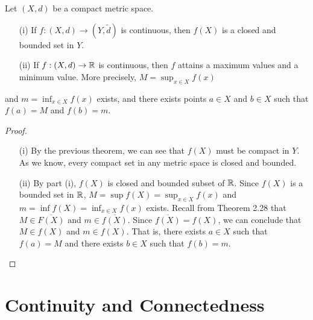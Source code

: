 \documentclass[a4paper]{article}
\begin{document}
\begin{theorem}
    Let \( (X,d) \) be a compact metric space. 
    \begin{enumerate}
        \item[(i)] If \( f: (X,d) \to (Y,\tilde{d}) \) is continuous, then \( f(X) \) is a closed and bounded set in \( Y  \). 
        \item[(ii)] If \( f: (X,d) \to \mathbb{R}   \) is continuous, then \( f  \) attains a maximum values and a minimum value. More precisely, \( M = \sup_{x \in X } f(x)  \)
    \end{enumerate} and \( m = \inf_{x \in X } f(x) \) exists, and there exists points \( a \in X  \) and \( b \in X  \) such that \( f(a) = M  \) and \( f(b) = m \).
\end{theorem}
\begin{proof}
\begin{enumerate}
    \item[(i)] By the previous theorem, we can see that \( f(X) \) must be compact in \( Y  \). As we know, every compact set in any metric space is closed and bounded. 
    \item[(ii)] By part (i), \( f(X)  \) is closed and bounded subset of \( \mathbb{R}  \). Since \( f(X) \) is a bounded set in \( \mathbb{R}  \), \( M = \sup f(X) = {\sup}_{x \in X }f(x) \) and \( m = \inf f(X) = {\inf}_{x \in X} f(x) \) exists. Recall from Theorem 2.28 that \( M \in \overline{F(X)} \) and \( m \in \overline{f(X)} \). Since \( \overline{f(X)} = f(X) \), we can conclude that \( M \in f(X) \) and \( m \in f(X) \). That is, there exists \( a \in X  \) such that \( f(a) = M  \) and there exists \( b \in X  \) such that \( f(b) = m \).
\end{enumerate}
\end{proof}

\section{Continuity and Connectedness}\label{Continuity and Connectedness}
\end{document}
